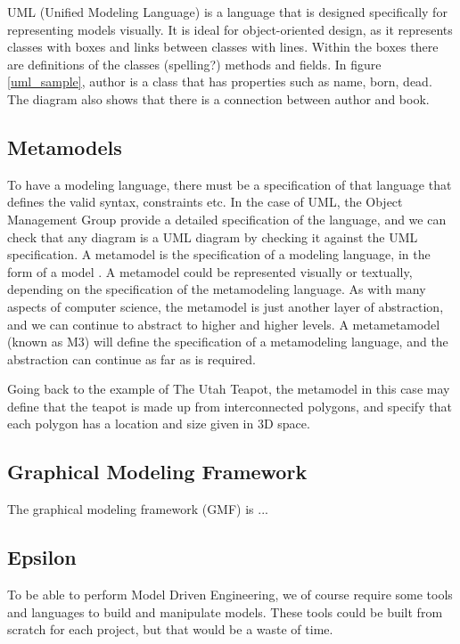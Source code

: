 UML (Unified Modeling Language) is a language that is designed specifically for representing models visually. It is ideal for object-oriented design, as it represents classes with boxes and links between classes with lines. Within the boxes there are definitions of the classes (spelling?) methods and fields. In figure \ref{uml_sample}, author is a class that has properties such as name, born, dead. The diagram also shows that there is a connection between author and book.

\subsection{Metamodels}
To have a modeling language, there must be a specification of that language that defines the valid syntax, constraints etc. In the case of UML, the Object Management Group provide a detailed specification \citep{umlSpec} of the language, and we can check that any diagram is a UML diagram by checking it against the UML specification.
A metamodel is the specification of a modeling language, in the form of a model \citep{brambillaBook}. A metamodel could be represented visually or textually, depending on the specification of the metamodeling language. As with many aspects of computer science, the metamodel is just another layer of abstraction, and we can continue to abstract to higher and higher levels. A metametamodel (known as M3) will define the specification of a metamodeling language, and the abstraction can continue as far as is required.

Going back to the example of The Utah Teapot, the metamodel in this case may define that the teapot is made up from interconnected polygons, and specify that each polygon has a location and size given in 3D space. 

\subsection{Graphical Modeling Framework}

The graphical modeling framework (GMF) is ...

\subsection{Epsilon}
To be able to perform Model Driven Engineering, we of course require some tools and languages to build and manipulate models. These tools could be built from scratch for each project, but that would be a waste of time.

